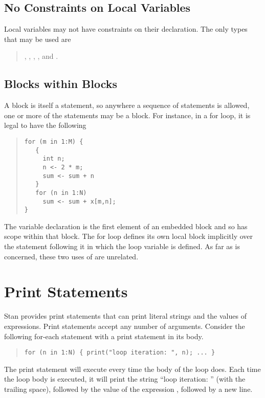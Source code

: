 \subsection{No Constraints on Local Variables}

Local variables may not have constraints on their declaration.  The
only types that may be used are
%
\begin{quote}
, , 
, , and .
\end{quote}

\subsection{Blocks within Blocks}

A block is itself a statement, so anywhere a sequence of statements is
allowed, one or more of the statements may be a block.  For instance,
in a for loop, it is legal to have the following
%
\begin{quote}
\begin{Verbatim}[fontsize=\small]
for (m in 1:M) {
   { 
     int n;  
     n <- 2 * m; 
     sum <- sum + n 
   }
   for (n in 1:N) 
     sum <- sum + x[m,n];
}
\end{Verbatim}
\end{quote}
%
The variable declaration  is the first element of an
embedded block and so has scope within that block.  The for loop
defines its own local block implicitly over the statement following it
in which the loop variable is defined.  As far as \Stan is concerned,
these two uses of  are unrelated.  

\section{Print Statements}\label{print-statements.section}

Stan provides print statements that can print literal strings and the
values of expressions.  Print statements accept any number of
arguments.  Consider the following for-each statement with a print
statement in its body.
%
\begin{quote}
\begin{Verbatim}[fontsize=\small]
for (n in 1:N) { print("loop iteration: ", n); ... }
\end{Verbatim}
\end{quote}
%
The print statement will execute every time the body of the loop does.
Each time the loop body is executed, it will print the string ``loop iteration:
'' (with the trailing space), followed by the value of the expression
, followed by a new line.

